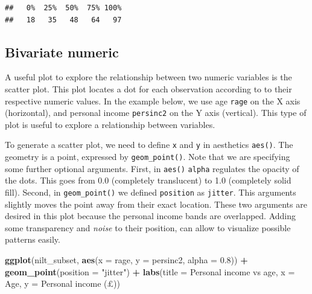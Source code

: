 \documentclass[
]{book}
\newenvironment{Shaded}{\begin{snugshade}}{\end{snugshade}}
\newcommand{\AttributeTok}[1]{\textcolor[rgb]{0.13,0.29,0.53}{#1}}
\newcommand{\FloatTok}[1]{\textcolor[rgb]{0.00,0.00,0.81}{#1}}
\newcommand{\FunctionTok}[1]{\textcolor[rgb]{0.13,0.29,0.53}{\textbf{#1}}}
\newcommand{\NormalTok}[1]{#1}
\newcommand{\SpecialCharTok}[1]{\textcolor[rgb]{0.81,0.36,0.00}{\textbf{#1}}}
\newcommand{\StringTok}[1]{\textcolor[rgb]{0.31,0.60,0.02}{#1}}
\begin{document}
\begin{Shaded}
\end{Shaded}

\begin{verbatim}
##   0%  25%  50%  75% 100% 
##   18   35   48   64   97
\end{verbatim}

\hypertarget{bivariate-numeric}{%
\subsection{Bivariate numeric}\label{bivariate-numeric}}

A useful plot to explore the relationship between two numeric variables is the scatter plot. This plot locates a dot for each observation according to to their respective numeric values. In the example below, we use age \texttt{rage} on the X axis (horizontal), and personal income \texttt{persinc2} on the Y axis (vertical). This type of plot is useful to explore a relationship between variables.

To generate a scatter plot, we need to define \texttt{x} and \texttt{y} in aesthetics \texttt{aes()}. The geometry is a point, expressed by \texttt{geom\_point()}. Note that we are specifying some further optional arguments. First, in \texttt{aes()} \texttt{alpha} regulates the opacity of the dots. This goes from 0.0 (completely translucent) to 1.0 (completely solid fill). Second, in \texttt{geom\_point()} we defined \texttt{position} as \texttt{jitter}. This arguments slightly moves the point away from their exact location. These two arguments are desired in this plot because the personal income bands are overlapped. Adding some transparency and \emph{noise} to their position, can allow to visualize possible patterns easily.

\begin{Shaded}
\begin{Highlighting}[]
\FunctionTok{ggplot}\NormalTok{(nilt\_subset, }\FunctionTok{aes}\NormalTok{(}\AttributeTok{x =}\NormalTok{ rage, }\AttributeTok{y =}\NormalTok{ persinc2, }\AttributeTok{alpha =} \FloatTok{0.8}\NormalTok{)) }\SpecialCharTok{+}
  \FunctionTok{geom\_point}\NormalTok{(}\AttributeTok{position =} \StringTok{"jitter"}\NormalTok{) }\SpecialCharTok{+}
  \FunctionTok{labs}\NormalTok{(}\AttributeTok{title =} \StringTok{\textquotesingle{}Personal income vs age\textquotesingle{}}\NormalTok{, }\AttributeTok{x =} \StringTok{\textquotesingle{}Age\textquotesingle{}}\NormalTok{, }\AttributeTok{y =} \StringTok{\textquotesingle{}Personal income (£)\textquotesingle{}}\NormalTok{)}
\end{Highlighting}
\end{Shaded}
\end{document}
